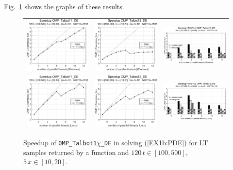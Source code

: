 \documentclass[a4paper,10pt]{report}%
\begin{document}
Fig.~\ref{PAR_EX1b_speedup_fun1} shows the graphs of these results.
\begin{figure}[htb]
\centering
\begin{tabular}{ccc} %
\includegraphics[height=0.2\textwidth]{./FIGS/EX1b/EX1b_fun1_speedup_11_Windows.eps} &
\includegraphics[height=0.2\textwidth]{./FIGS/EX1b/EX1b_fun1_speedup_12_Windows.eps} &
\includegraphics[height=0.2\textwidth,keepaspectratio=true]{./FIGS/EX1b/EX1b_fun1_speedup_13_Windows.eps} \\
\includegraphics[height=0.2\textwidth]{./FIGS/EX1b/EX1b_fun1_speedup_11_Linux.eps} &
\includegraphics[height=0.2\textwidth]{./FIGS/EX1b/EX1b_fun1_speedup_12_Linux.eps} &
\includegraphics[height=0.2\textwidth,keepaspectratio=true]{./FIGS/EX1b/EX1b_fun1_speedup_13_Linux.eps}
\end{tabular}
\caption{\small Speedup of {\tt OMP\_Talbot1$\chi$\_DE} in solving (\ref{EX1b:PDE}) for LT samples
returned by a function and $120\,t\in[100,500]$, $5\,x\in[10,20]$.}
\label{PAR_EX1b_speedup_fun1}
\end{figure}
\end{document}
